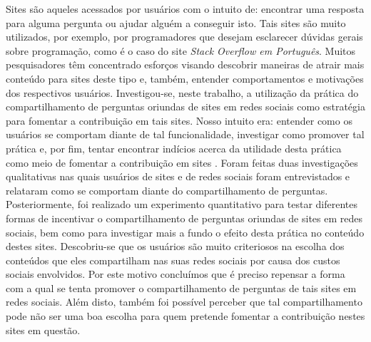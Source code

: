 Sites \qa são aqueles acessados por usuários com o intuito de: encontrar uma resposta para alguma pergunta ou ajudar alguém a conseguir isto. Tais sites são muito utilizados, por exemplo, por programadores que desejam esclarecer dúvidas gerais sobre programação, como é o caso do site \textit{Stack Overflow em Português}. Muitos pesquisadores têm concentrado esforços visando descobrir maneiras de atrair mais conteúdo para sites deste tipo e, também, entender comportamentos e motivações dos respectivos usuários. Investigou-se, neste trabalho, a utilização da prática do compartilhamento de perguntas oriundas de sites \qa em redes sociais como estratégia para fomentar a contribuição em tais sites. Nosso intuito era: entender como os usuários se comportam diante de tal funcionalidade, investigar como promover tal prática e, por fim, tentar encontrar indícios acerca da utilidade desta prática como meio de fomentar a contribuição em sites \qanospace. Foram feitas duas investigações qualitativas nas quais usuários de sites \qa e de redes sociais foram entrevistados e relataram como se comportam diante do compartilhamento de perguntas. Posteriormente, foi realizado um experimento quantitativo para testar diferentes formas de incentivar o compartilhamento de perguntas oriundas de sites \qa em redes sociais, bem como para investigar mais a fundo o efeito desta prática no conteúdo destes sites. Descobriu-se que os usuários são muito criteriosos na escolha dos conteúdos que eles compartilham nas suas redes sociais por causa dos custos sociais envolvidos. Por este motivo concluímos que é preciso repensar a forma com a qual se tenta promover o compartilhamento de perguntas de tais sites em redes sociais. Além disto, também foi possível perceber que tal compartilhamento pode não ser uma boa escolha para quem pretende fomentar a contribuição nestes sites em questão.